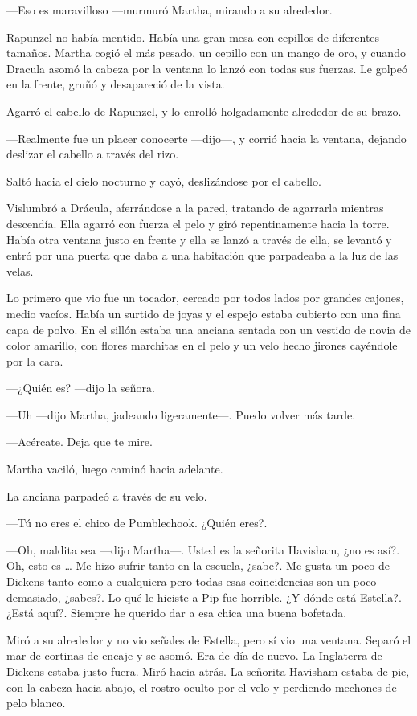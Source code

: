 ---Eso es maravilloso ---murmuró Martha, mirando a su alrededor.

Rapunzel no había mentido. Había una gran mesa con cepillos de diferentes tamaños. Martha cogió el más pesado, un cepillo con un mango de oro, y cuando Dracula asomó la cabeza por la ventana lo lanzó con todas sus fuerzas. Le golpeó en la frente, gruñó y desapareció de la vista.

Agarró el cabello de Rapunzel, y lo enrolló holgadamente alrededor de su brazo.

---Realmente fue un placer conocerte ---dijo---, y corrió hacia la ventana, dejando deslizar el cabello a través del rizo.

Saltó hacia el cielo nocturno y cayó, deslizándose por el cabello.

Vislumbró a Drácula, aferrándose a la pared, tratando de agarrarla mientras descendía. Ella agarró con fuerza el pelo y giró repentinamente hacia la torre. Había otra ventana justo en frente y ella se lanzó a través de ella, se levantó y entró por una puerta que daba a una habitación que parpadeaba a la luz de las velas.

Lo primero que vio fue un tocador, cercado por todos lados por grandes cajones, medio vacíos. Había un surtido de joyas y el espejo estaba cubierto con una fina capa de polvo. En el sillón estaba una anciana sentada con un vestido de novia de color amarillo, con flores marchitas en el pelo y un velo hecho jirones cayéndole por la cara.

---¿Quién es? ---dijo la señora.

---Uh ---dijo Martha, jadeando ligeramente---. Puedo volver más tarde.

---Acércate. Deja que te mire.

Martha vaciló, luego caminó hacia adelante.

La anciana parpadeó a través de su velo.

---Tú no eres el chico de Pumblechook. ¿Quién eres?.

---Oh, maldita sea ---dijo Martha---. Usted es la señorita Havisham, ¿no es así?. Oh, esto es \ldots{} Me hizo sufrir tanto en la escuela, ¿sabe?. Me gusta un poco de Dickens tanto como a cualquiera pero todas esas coincidencias son un poco demasiado, ¿sabes?. Lo qué le hiciste a Pip fue horrible. ¿Y dónde está Estella?. ¿Está aquí?. Siempre he querido dar a esa chica una buena bofetada.

Miró a su alrededor y no vio señales de Estella, pero sí vio una ventana. Separó el mar de cortinas de encaje y se asomó. Era de día de nuevo. La Inglaterra de Dickens estaba justo fuera. Miró hacia atrás. La señorita Havisham estaba de pie, con la cabeza hacia abajo, el rostro oculto por el velo y perdiendo mechones de pelo blanco.

